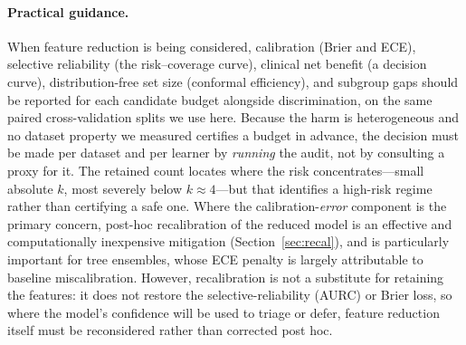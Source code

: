 \documentclass[fleqn,10pt]{wlscirep}
\newcommand{\result}[1]{#1}
\begin{document}
\paragraph{Practical guidance.} When feature reduction is being considered, calibration (Brier
and ECE), selective reliability (the risk--coverage curve), clinical net benefit (a decision curve),
distribution-free set size (conformal efficiency), and subgroup gaps should be reported
for each candidate budget alongside discrimination, on the same paired cross-validation splits we
use here. Because the harm is heterogeneous and no dataset property we measured certifies a budget in
advance, the decision must be made per dataset and per learner by \emph{running} the audit, not by
consulting a proxy for it. The retained count locates where the risk concentrates---small absolute
$k$, most severely below $k\approx\result{4}$---but that identifies a high-risk regime rather than
certifying a safe one. Where the calibration-\emph{error} component is the primary concern,
post-hoc recalibration of the reduced model is an effective and computationally inexpensive mitigation
(Section~\ref{sec:recal}), and is particularly important for tree ensembles, whose ECE penalty is
largely attributable to baseline miscalibration. However, recalibration is not a substitute for
retaining the features: it does not restore the selective-reliability (AURC) or Brier loss, so where the
model's confidence will be used to triage or defer, feature reduction itself must be reconsidered rather
than corrected post hoc.

\medskip
\noindent{}
\medskip
\end{document}
